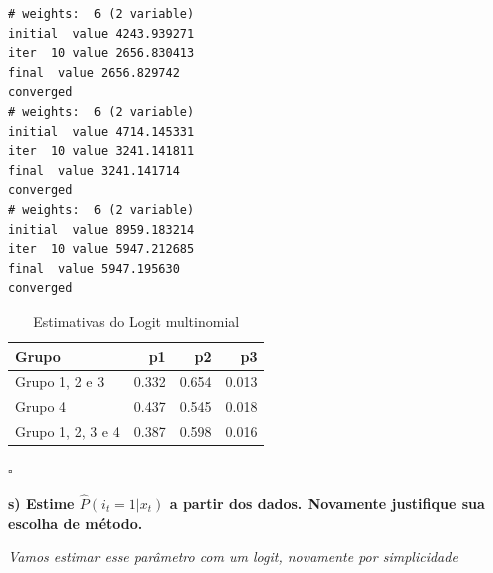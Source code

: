 \documentclass[12pt,a4paper]{article}
\newenvironment{Shaded}{\begin{snugshade}}{\end{snugshade}}
\newcommand{\CommentTok}[1]{\textcolor[rgb]{0.56,0.35,0.01}{\textit{#1}}}
\newcommand{\DataTypeTok}[1]{\textcolor[rgb]{0.13,0.29,0.53}{#1}}
\newcommand{\DecValTok}[1]{\textcolor[rgb]{0.00,0.00,0.81}{#1}}
\newcommand{\KeywordTok}[1]{\textcolor[rgb]{0.13,0.29,0.53}{\textbf{#1}}}
\newcommand{\NormalTok}[1]{#1}
\newcommand{\OperatorTok}[1]{\textcolor[rgb]{0.81,0.36,0.00}{\textbf{#1}}}
\newcommand{\OtherTok}[1]{\textcolor[rgb]{0.56,0.35,0.01}{#1}}
\newcommand{\StringTok}[1]{\textcolor[rgb]{0.31,0.60,0.02}{#1}}
\begin{document}
\begin{verbatim}
# weights:  6 (2 variable)
initial  value 4243.939271 
iter  10 value 2656.830413
final  value 2656.829742 
converged
# weights:  6 (2 variable)
initial  value 4714.145331 
iter  10 value 3241.141811
final  value 3241.141714 
converged
# weights:  6 (2 variable)
initial  value 8959.183214 
iter  10 value 5947.212685
final  value 5947.195630 
converged
\end{verbatim}

\begin{Shaded}
\end{Shaded}

\begin{table}[ht]
\centering
\begin{tabular}{lrrr}
  \hline
Grupo & p1 & p2 & p3 \\ 
  \hline
Grupo 1, 2 e 3 & 0.332 & 0.654 & 0.013 \\ 
  Grupo 4 & 0.437 & 0.545 & 0.018 \\ 
  Grupo 1, 2, 3 e 4 & 0.387 & 0.598 & 0.016 \\ 
   \hline
\end{tabular}
\caption{Estimativas do Logit multinomial} 
\label{tab:5}
\end{table}

\(\square\)

\textbf{s) Estime \(\hat{P}(i_t=1|x_t)\) a partir dos dados. Novamente
justifique sua escolha de método.}

\emph{Vamos estimar esse parâmetro com um logit, novamente por
simplicidade}
\end{document}
